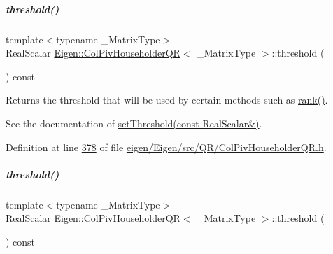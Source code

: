\mbox{\label{group___q_r___module_a72276adb1aa11f870f50d0bd58af014d}} 
\subparagraph{\texorpdfstring{threshold()}{threshold()}\hspace{0.1cm}{\footnotesize\ttfamily [1/2]}}
{\footnotesize\ttfamily template$<$typename \+\_\+\+Matrix\+Type$>$ \\
Real\+Scalar \hyperlink{group___q_r___module_class_eigen_1_1_col_piv_householder_q_r}{Eigen\+::\+Col\+Piv\+Householder\+QR}$<$ \+\_\+\+Matrix\+Type $>$\+::threshold (\begin{DoxyParamCaption}{ }\end{DoxyParamCaption}) const\hspace{0.3cm}{\ttfamily [inline]}}

Returns the threshold that will be used by certain methods such as \hyperlink{group___q_r___module_a2a59aaa689613ce5ef0c9130ad33940e}{rank()}.

See the documentation of \hyperlink{group___q_r___module_ae712cdc9f0e521cfc8061bee58ff55ee}{set\+Threshold(const Real\+Scalar\&)}. 

Definition at line \hyperlink{eigen_2_eigen_2src_2_q_r_2_col_piv_householder_q_r_8h_source_l00378}{378} of file \hyperlink{eigen_2_eigen_2src_2_q_r_2_col_piv_householder_q_r_8h_source}{eigen/\+Eigen/src/\+Q\+R/\+Col\+Piv\+Householder\+Q\+R.\+h}.

\mbox{\label{group___q_r___module_a72276adb1aa11f870f50d0bd58af014d}} 
\subparagraph{\texorpdfstring{threshold()}{threshold()}\hspace{0.1cm}{\footnotesize\ttfamily [2/2]}}
{\footnotesize\ttfamily template$<$typename \+\_\+\+Matrix\+Type$>$ \\
Real\+Scalar \hyperlink{group___q_r___module_class_eigen_1_1_col_piv_householder_q_r}{Eigen\+::\+Col\+Piv\+Householder\+QR}$<$ \+\_\+\+Matrix\+Type $>$\+::threshold (\begin{DoxyParamCaption}{ }\end{DoxyParamCaption}) const\hspace{0.3cm}{\ttfamily [inline]}}

